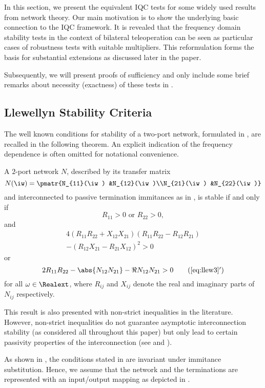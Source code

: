 In this section, we present the equivalent IQC tests for {some} widely used results from network theory. Our main motivation is to show  {the} underlying basic connection to
 {the IQC framework}. It is  {revealed} that the frequency domain stability tests in the context of bilateral teleoperation can be seen as particular cases of robustness tests with  {suitable} multipliers. This  reformulation forms the basis for substantial extensions as discussed later in the paper.

Subsequently, we will present proofs of sufficiency and only include some brief remarks about necessity (exactness) of these tests in .

\subsection{Llewellyn Stability Criteria}\label{sec:llewellyn}
The well known conditions for stability of a two-port network, formulated in \cite{llewellyn,bolinder,rollett}, are recalled in the following theorem. An explicit indication of the frequency dependence is  {often} omitted for notational convenience.
\begin{thm}\label{thm:llw}
A $2$-port network $N$,  described by its transfer matrix
\[
N(\iw) = \pmatr{N_{11}(\iw) &N_{12}(\iw)\\N_{21}(\iw) &N_{22}(\iw)}
\]
and interconnected to passive termination immitances as in , is stable if and only if
\begin{equation}R_{11} > 0\text{ or } R_{22} > 0,\label{eq:llew2}\end{equation} and
\begin{multline}4\left(R_{11}R_{22}+X_{12}X_{21}\right)\left(R_{11}R_{22}-R_{12}R_{21}\right)\\-
	\left(R_{12}X_{21}-R_{21}X_{12}\right)^2 > 0\label{eq:llew3}\end{multline} or
\begin{equation}2R_{11}R_{22}-\abs{N_{12}N_{21}}-\Re{N_{12}N_{21}} > 0\tag{\ref{eq:llew3}$'$}\label{eq:llew3p}\end{equation}
for all $\omega\in\Realext$, where $R_{ij}$ and $X_{ij}$ denote the real and imaginary parts of $N_{ij}$ respectively.
\end{thm}

\begin{rem}\label{rem:nonstrictness}This result is also presented with non-strict inequalities in the literature. However, non-strict inequalities do not guarantee asymptotic interconnection stability (as considered all throughout this paper) but only lead to certain passivity properties of the interconnection (see \cite[Thm. 6.1]{khalil} and \cite[Sec. V]{lawrence}). 
\end{rem}
As shown in \cite{rollett}, the conditions stated in  are invariant under immitance substitution. Hence, we assume that the network and the terminations are represented with an input/output mapping {as depicted in  .}

